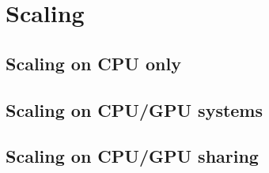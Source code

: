 \section{Scaling}
\subsection{Scaling on CPU only}
\subsection{Scaling on CPU/GPU systems}
\subsection{Scaling on CPU/GPU sharing}